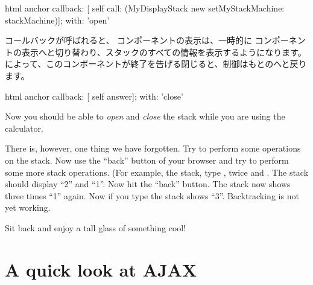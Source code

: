 \documentclass[a4paper,10pt,twoside]{book}
\begin{document}
\begin{code}{}
html anchor
	callback: [ self call: (MyDisplayStack new setMyStackMachine: stackMachine)];
	with: 'open'
\end{code}

コールバックが呼ばれると、 コンポーネントの表示は、一時的に コンポーネントの表示へと切り替わり、スタックのすべての情報を表示するようになります。によって、このコンポーネントが終了を告げる閉じると、制御はもとのへと戻ります。


\begin{code}{}
html anchor
	callback: [ self answer];
	with: 'close'
\end{code}

Now you should be able to \emph{open} and \emph{close} the stack while you are using the calculator.

There is, however, one thing we have forgotten.
Try to perform some operations on the stack.
Now use the ``back'' button of your browser and try to perform some more stack operations.
(For example,  the stack, type ,  twice and \menu {+}.
The stack should display ``2'' and ``1''.
Now hit the ``back'' button.
The stack now shows three times ``1'' again.
Now if you type \menu{+} the stack shows ``3''.
Backtracking is not yet working.


Sit back and enjoy a tall glass of something cool!

\section{A quick look at AJAX}

\end{document}

